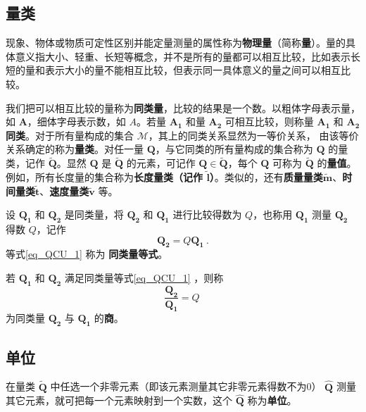 \subsection{量类}
现象、物体或物质可定性区别并能定量测量的属性称为\textbf{物理量}（简称\textbf{量}）。量的具体意义指大小、轻重、长短等概念，并不是所有的量都可以相互比较，比如表示长短的量和表示大小的量不能相互比较，但表示同一具体意义的量之间可以相互比较。

我们把可以相互比较的量称为\textbf{同类量}，比较的结果是一个数。以粗体字母表示量，如 $\boldsymbol{A}$，细体字母表示数，如 $A$。若量 $\boldsymbol{A_1}$ 和量 $\boldsymbol{A_2}$ 可相互比较，则称量 $\boldsymbol{A_1}$ 和 $\boldsymbol{A_2}$ \textbf{同类}。对于所有量构成的集合 $\mathcal{M}$，其上的同类关系显然为一等价关系， 由该等价关系确定的称为\textbf{量类}。对任一量 $\boldsymbol{Q}$，与它同类的所有量构成的集合称为 $\boldsymbol{Q}$ 的量类，记作 $\tilde{\boldsymbol{Q}}$。显然 $\boldsymbol{Q}$ 是 $\tilde{\boldsymbol{Q}}$ 的元素，可记作 $\boldsymbol{Q}\in \tilde{\boldsymbol{Q}}$，每个 $\boldsymbol{Q}$ 可称为 $\tilde{\boldsymbol{Q}}$ 的\textbf{量值}。例如，所有长度量的集合称为\textbf{长度量类（记作 $\tilde{\boldsymbol{l}}$）}。类似的，还有\textbf{质量量类}$\tilde{\boldsymbol{m}}$、\textbf{时间量类}$\tilde{\boldsymbol{t}}$、\textbf{速度量类}$\tilde{\boldsymbol{v}}$ 等。

设 $\boldsymbol{Q_1}$ 和 $\boldsymbol{Q_2}$ 是同类量，将 $\boldsymbol{Q_2}$ 和 $\boldsymbol{Q_1}$ 进行比较得数为 $Q$，也称用 $\boldsymbol{Q_1}$ 测量 $\boldsymbol{Q_2}$ 得数 $Q$，记作
\begin{equation}\label{eq_QCU_1}
\boldsymbol{Q_2}=Q\boldsymbol{Q_1}~.
\end{equation}
等式\autoref{eq_QCU_1} 称为 \textbf{同类量等式}。
\begin{definition}{}
若 $\boldsymbol{Q_1}$ 和 $\boldsymbol{Q_2}$ 满足同类量等式\autoref{eq_QCU_1} ，则称
\begin{equation}\label{eq_QCU_4}
\frac{\boldsymbol{Q_2}}{\boldsymbol{Q_1}}=Q~
\end{equation}
为同类量 $\boldsymbol{Q_2}$ 与 $\boldsymbol{Q_1}$ 的\textbf{商}。
\end{definition}
\subsection{单位}
在量类 $\tilde{\boldsymbol{Q}}$ 中任选一个非零元素（即该元素测量其它非零元素得数不为0） $\hat{\boldsymbol{Q}}$ 测量其它元素，就可把每一个元素映射到一个实数，这个 $\hat{\boldsymbol{Q}}$ 称为\textbf{单位}。

